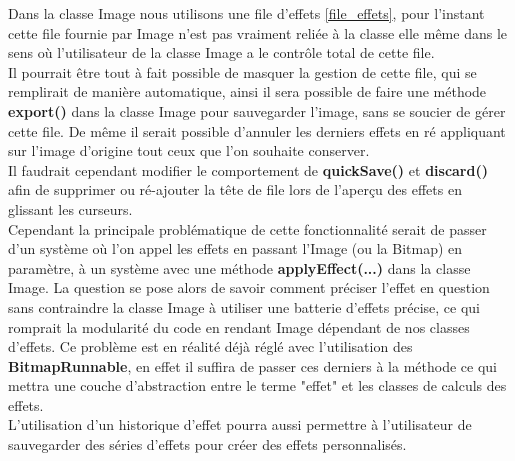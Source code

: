 Dans la classe Image nous utilisons une file d'effets \ref{file_effets}, pour l'instant cette file fournie par Image n'est pas vraiment reliée à la classe elle même dans le sens où l'utilisateur de la classe Image a le contrôle total de cette file.
\\
Il pourrait être tout à fait possible de masquer la gestion de cette file, qui se remplirait de manière automatique, ainsi il sera possible de faire une méthode \textbf{export()} dans la classe Image pour sauvegarder l'image, sans se soucier de gérer cette file. De même il serait possible d'annuler les derniers effets en ré appliquant sur l'image d'origine tout ceux que l'on souhaite conserver.
\\
Il faudrait cependant modifier le comportement de \textbf{quickSave()} et \textbf{discard()} afin de supprimer ou ré-ajouter la tête de file lors de l'aperçu des effets en glissant les curseurs.
\\
Cependant la principale problématique de cette fonctionnalité serait de passer d'un système où l'on appel les effets en passant l'Image (ou la Bitmap) en paramètre, à un système avec une méthode \textbf{applyEffect(...)} dans la classe Image. La question se pose alors de savoir comment préciser l'effet en question sans contraindre la classe Image à utiliser une batterie d'effets précise, ce qui romprait la modularité du code en rendant Image dépendant de nos classes d'effets. Ce problème est en réalité déjà réglé avec l'utilisation des \textbf{BitmapRunnable}, en effet il suffira de passer ces derniers à la méthode ce qui mettra une couche d'abstraction entre le terme "effet" et les classes de calculs des effets.
\\

L'utilisation d'un historique d'effet pourra aussi permettre à l'utilisateur de sauvegarder des séries d'effets pour créer des effets personnalisés.
\\